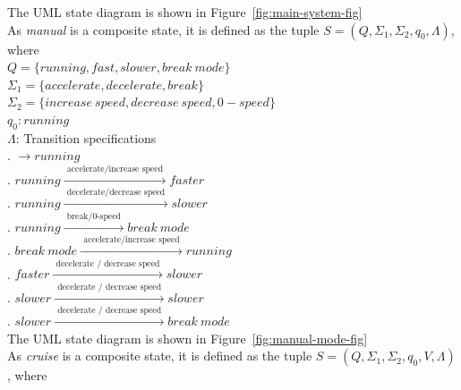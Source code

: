 \documentclass[12pt]{article}
\begin{document}
\begin{spacing}{1.5}
\noindent The UML state diagram is shown in Figure~\ref{fig:main-system-fig}\\


\noindent As \textit{manual} is a composite state, it is defined as the tuple $S = (Q, \Sigma_1, \Sigma_2, q_0, \Lambda)$, where\\

\noindent $Q = \{running, fast, slower, break~mode\}$\\
\noindent $\Sigma_1 = \{accelerate, decelerate, break\}$\\
\noindent $\Sigma_2 = \{increase~speed, decrease~speed, 0-speed\}$\\
\noindent $q_0: running$\\
\noindent $\Lambda$: Transition specifications\\
. $\rightarrow running$\\
. $running \xrightarrow {\text { accelerate/increase speed }} faster$\\
. $running \xrightarrow {\text { decelerate/decrease speed }} slower$\\
. $running \xrightarrow {\text { break/0-speed }} break~mode$\\
. $break~mode \xrightarrow {\text { accelerate/increase speed }} running$\\
. $faster \xrightarrow {\text { decelerate / decrease speed }} slower$\\
. $slower \xrightarrow {\text { decelerate / decrease speed }} slower$\\
. $slower \xrightarrow {\text { decelerate / decrease speed }} break~mode$\\

\noindent The UML state diagram is shown in Figure~\ref{fig:manual-mode-fig}\\


\noindent As \textit{cruise} is a composite state, it is defined as the tuple $S = (Q, \Sigma_1, \Sigma_2, q_0, V, \Lambda)$, where\\


\end{spacing}
\end{document}
